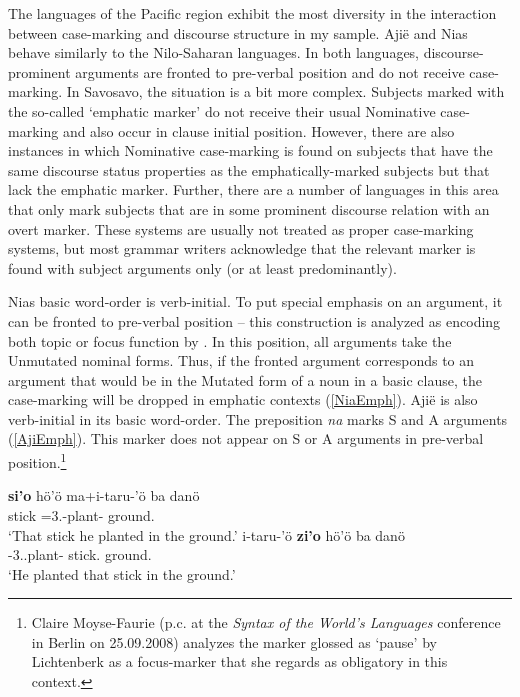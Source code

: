The languages of the Pacific region exhibit the most diversity in the interaction between case-marking and discourse structure in my sample. 
Aji\"e and Nias behave similarly to the Nilo-Saharan languages. 
In both languages, discourse-prominent arguments are fronted to pre-verbal position and do not receive case-marking. 
In Savosavo, the situation is a bit more complex. 
Subjects marked with the so-called `emphatic marker' do not receive their usual Nominative case-marking and also occur in clause initial position. 
However, there are also instances in which Nominative case-marking is found on subjects that have the same discourse status properties as the emphatically-marked subjects but that lack the emphatic marker. 
Further, there are a number of languages in this area that only mark subjects that are in some prominent discourse relation with an overt marker. 
These systems are usually not treated as proper case-marking systems, but most grammar writers acknowledge that the relevant marker is found with subject arguments only (or at least predominantly).

Nias basic word-order is verb-initial. 
To put special emphasis on an argument, it can be fronted to pre-verbal position -- this construction is analyzed as encoding both topic or focus function by \citet[60]{Donohue.Brown:1999}. 
In this position, all arguments take the Unmutated nominal forms. 
Thus, if the fronted argument corresponds to an argument that would be in the Mutated form of a noun in a basic clause, the case-marking will be dropped in emphatic contexts (\ref{NiaEmph}). 
Aji\"e is also verb-initial in its basic word-order.  
The preposition \emph{na} marks S and A arguments (\ref{AjiEmph}). 
This marker does not appear on S or A arguments in pre-verbal position.\footnote{Claire Moyse-Faurie (p.c. at the \emph{Syntax of the World's Languages} conference in Berlin on 25.09.2008) analyzes the marker glossed as `pause' by Lichtenberk as a focus-marker that she regards as obligatory in this context.} 

\begin{exe}\ex\label{NiaEmph}
\begin{xlist}\ex\gll
\textbf{si'o} h\"o'\"o ma+i-taru-'\"o ba dan\"o\\
stick \dist{} \prf{}=3\sg{}.\rls{}-plant-\transitiv{} \loc{} ground.\mut{}\\
\glt `That stick he planted in the ground.'
\ex\gll 
i-taru-'\"o \textbf{zi'o} h\"o'\"o ba dan\"o\\
\prf{}-3\sg{}.\rls{}.plant-\transitiv{} stick.\mut{} \dist{} \loc{} ground.\mut{}\\
\glt `He planted that stick in the ground.'
\end{xlist}\end{exe}

